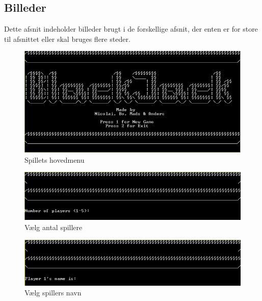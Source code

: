 \documentclass[a4paper]{article}
\begin{document}
        
        
        

      \subsection{Billeder}
        Dette afsnit indeholder billeder brugt i de forskellige afsnit,
        der enten er for store til afsnittet eller skal bruges flere steder.

        \begin{figure}[H]
          \includegraphics{figures/MainMenu.PNG}

          \caption{Spillets hovedmenu}
          \label{fig:mainMenu}
        \end{figure}

        \begin{figure}[H]
          \includegraphics{figures/SelectPlayers.PNG}

          \caption{Vælg antal spillere}
          \label{fig:selectPlayers}
        \end{figure}

        \begin{figure}[H]
          \includegraphics{figures/PlayerName.PNG}

          \caption{Vælg spillers navn}
          \label{fig:selectPlayerName}
        \end{figure}
\end{document}
